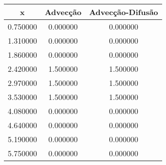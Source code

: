 \begin{tabular}{ccc}
\toprule
x & Advecção & Advecção-Difusão \\
\midrule
0.750000 & 0.000000 & 0.000000 \\
1.310000 & 0.000000 & 0.000000 \\
1.860000 & 0.000000 & 0.000000 \\
2.420000 & 1.500000 & 1.500000 \\
2.970000 & 1.500000 & 1.500000 \\
3.530000 & 1.500000 & 1.500000 \\
4.080000 & 0.000000 & 0.000000 \\
4.640000 & 0.000000 & 0.000000 \\
5.190000 & 0.000000 & 0.000000 \\
5.750000 & 0.000000 & 0.000000 \\
\bottomrule
\end{tabular}
